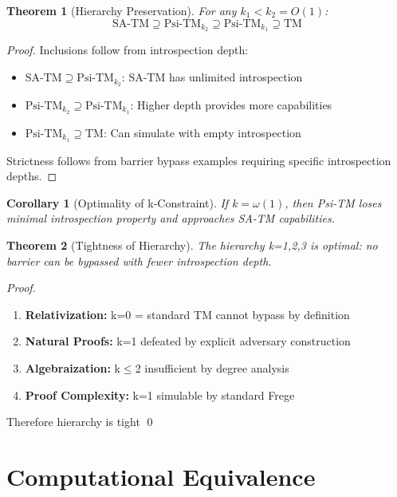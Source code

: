 \documentclass[11pt]{article}
\newtheorem{theorem}{Theorem}
\newtheorem{corollary}{Corollary}
\begin{document}
\begin{theorem}[Hierarchy Preservation]
For any $k_1 < k_2 = O(1)$:
$$\text{SA-TM} \supseteq \text{Psi-TM}_{k_2} \supseteq \text{Psi-TM}_{k_1} \supseteq \text{TM}$$
\end{theorem}

\begin{proof}
Inclusions follow from introspection depth:
\begin{itemize}
\item $\text{SA-TM} \supseteq \text{Psi-TM}_{k_2}$: SA-TM has unlimited introspection
\item $\text{Psi-TM}_{k_2} \supseteq \text{Psi-TM}_{k_1}$: Higher depth provides more capabilities  
\item $\text{Psi-TM}_{k_1} \supseteq \text{TM}$: Can simulate with empty introspection
\end{itemize}
Strictness follows from barrier bypass examples requiring specific introspection depths.
\end{proof}

\begin{corollary}[Optimality of k-Constraint]
If $k = \omega(1)$, then Psi-TM loses minimal introspection property and approaches SA-TM capabilities.
\end{corollary}

\begin{theorem}[Tightness of Hierarchy]
The hierarchy k=1,2,3 is optimal: no barrier can be bypassed with fewer introspection depth.
\end{theorem}

\begin{proof}
\begin{enumerate}
\item \textbf{Relativization:} k=0 = standard TM cannot bypass by definition
\item \textbf{Natural Proofs:} k=1 defeated by explicit adversary construction
\item \textbf{Algebraization:} k$\leq$2 insufficient by degree analysis
\item \textbf{Proof Complexity:} k=1 simulable by standard Frege
\end{enumerate}
Therefore hierarchy is tight \qed
\end{proof}

\section{Computational Equivalence}
\end{document}
